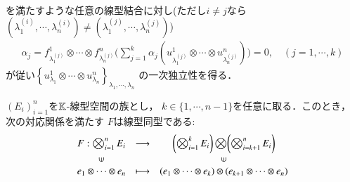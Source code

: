 \begin{prf}
\begin{description}
\begin{align}
				\end{align}
				を満たすような任意の線型結合に対し(ただし$i \neq j$なら$(\lambda_1^{(i)},\cdots,\lambda_n^{(i)}) \neq (\lambda_1^{(j)},\cdots,\lambda_n^{(j)})$)
				\begin{align}
					\alpha_j = f^1_{\lambda^{(j)}_1} \otimes \cdots \otimes f^n_{\lambda^{(j)}_n}
					\biggl( \sum_{j=1}^k \alpha_j \left(u^1_{\lambda^{(j)}_1} \otimes 
					\cdots \otimes u^n_{\lambda^{(j)}_n} \right) \biggr)
					= 0,
					\quad (j=1,\cdots,k)
				\end{align}
				が従い$\left\{ u^1_{\lambda_1} \otimes 
				\cdots \otimes u^n_{\lambda_n} \right\}_{\lambda_1,\cdots,\lambda_n}$
				の一次独立性を得る．
				\QED
		\end{description}
	\end{prf}
	
	\begin{screen}
		\begin{thm}[結合律]
		\label{thm:associativity_of_tensor_products}
			$(E_i)_{i=1}^n$を$\mathbb{K}$-線型空間の族とし，
			$k \in \{ 1,\cdots,n-1 \}$を任意に取る．このとき，次の対応関係を満たす
			$F$は線型同型である:
			\begin{align}
				\begin{array}{ccc}
					F:\bigotimes_{i=1}^n E_i & \longrightarrow & \biggl( \bigotimes_{i=1}^k E_i \biggr) \bigotimes \biggl( \bigotimes_{i=k+1}^n E_i \biggr) \\
					\rotatebox{90}{$\in$} & & \rotatebox{90}{$\in$} \\
					e_1 \otimes \cdots \otimes e_n & \longmapsto & (e_1 \otimes \cdots \otimes e_k) \otimes (e_{k+1} \otimes \cdots \otimes e_n)
				\end{array}
			\end{align}
		\end{thm}
	\end{screen}
	
